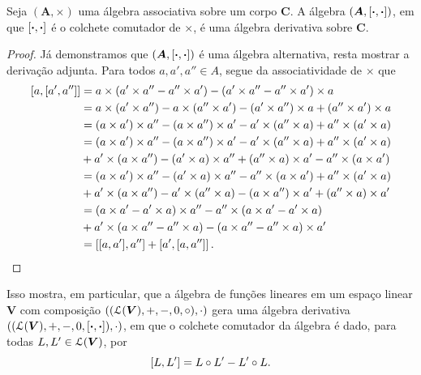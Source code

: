 \begin{proposition}
Seja $(\bm A,\times)$ uma álgebra associativa sobre um corpo $\bm C$. A álgebra $(\bm A,\left[{\bm{\cdot}},{\bm{\cdot}}\right])$, em que $\left[{\bm{\cdot}},{\bm{\cdot}}\right]$ é o colchete comutador de $\times$, é uma álgebra derivativa sobre $\bm C$.
\end{proposition}
\begin{proof}
Já demonstramos que $(\bm A,\left[{\bm{\cdot}},{\bm{\cdot}}\right])$ é uma álgebra alternativa, resta mostrar a derivação adjunta. Para todos $a,a',a'' \in A$, segue da associatividade de $\times$ que
	\begin{align*}
	\left[{a},{\left[{a'},{a''}\right]}\right] &= a \times (a' \times a'' - a'' \times a') - (a' \times a'' - a'' \times a') \times a \\
		&= a \times (a' \times a'') - a \times (a'' \times a') - (a' \times a'') \times a + (a'' \times a') \times a \\
		&= (a \times a') \times a'' - (a \times a'') \times a' - a' \times (a'' \times a) + a'' \times (a' \times a) \\
		&= (a \times a') \times a'' - (a \times a'') \times a' - a' \times (a'' \times a) + a'' \times (a' \times a) \\
		&+ a' \times (a \times a'') - (a' \times a) \times a'' + (a'' \times a) \times a' - a'' \times (a \times a') \\
		&= (a \times a') \times a'' - (a' \times a) \times a'' - a'' \times (a \times a') + a'' \times (a' \times a) \\
		&+ a' \times (a \times a'') - a' \times (a'' \times a) - (a \times a'') \times a' + (a'' \times a) \times a' \\
		&= (a \times a' - a' \times a) \times a'' - a'' \times (a \times a' - a' \times a) \\
		&+ a' \times (a \times a'' - a'' \times a) - (a \times a'' - a'' \times a) \times a' \\
		&= \left[{\left[{a},{a'}\right]},{a''}\right] + \left[{a'},{\left[{a},{a''}\right]}\right].
		\qedhere
	\end{align*}
\end{proof}

Isso mostra, em particular, que a álgebra de funções lineares em um espaço linear $\bm V$ com composição $((\mathcal{L}(\bm V),+,-,0,\circ),\cdot)$ gera uma álgebra derivativa $((\mathcal{L}(\bm V),+,-,0,\left[{\bm{\cdot}},{\bm{\cdot}}\right]),\cdot)$, em que o colchete comutador da álgebra é dado, para todas $L,L' \in \mathcal{L}(\bm V)$, por
	\begin{equation*}
	\left[{L},{L'}\right] = L \circ L' - L' \circ L.
	\end{equation*}

